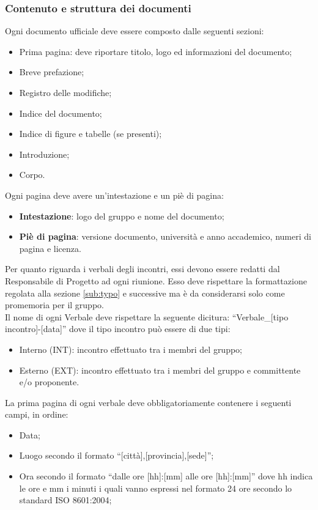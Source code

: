 {{	\subsubsection{Contenuto e struttura dei documenti}{
		\label{sub:content}
		Ogni documento ufficiale deve essere composto dalle seguenti sezioni:
		\begin{itemize}
			\item Prima pagina: deve riportare titolo, logo ed informazioni del documento;
			\item Breve prefazione;
			\item Registro delle modifiche;
			\item Indice del documento;
			\item Indice di figure e tabelle (se presenti);
			\item Introduzione;
			\item Corpo.
		\end{itemize}
		Ogni pagina deve avere un'intestazione e un piè di pagina:
		\begin{itemize}
			\item \textbf{Intestazione}: logo del gruppo e nome del documento;
			\item \textbf{Piè di pagina}: versione documento, università e anno accademico, numeri di pagina e licenza.
		\end{itemize}
		Per quanto riguarda i verbali degli incontri, essi devono essere redatti dal Responsabile di Progetto ad ogni riunione. Esso deve rispettare la formattazione regolata alla sezione \ref{sub:typo} e successive ma è da considerarsi solo come promemoria per il gruppo.\\
		Il nome di ogni Verbale deve rispettare la seguente dicitura: “Verbale\_[tipo incontro]-[data]” dove il tipo incontro può essere di due tipi:
		\begin{itemize}
			\item Interno (INT): incontro effettuato tra i membri del gruppo;
			\item Esterno (EXT): incontro effettuato tra i membri del gruppo e committente e/o proponente.
		\end{itemize}
		La prima pagina di ogni verbale deve obbligatoriamente contenere i seguenti campi, in ordine:
		\begin{itemize}
			\item Data;
			\item Luogo secondo il formato “[città],[provincia],[sede]”;
			\item Ora secondo il formato “dalle ore [hh]:[mm] alle ore [hh]:[mm]” dove hh indica le ore e mm i minuti i quali vanno espressi nel formato 24 ore secondo lo standard ISO 8601:2004;

\end{itemize}}}}
